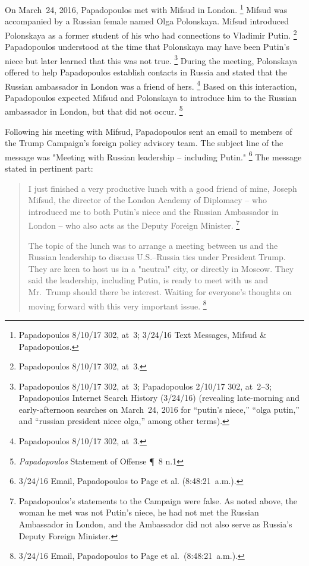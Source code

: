 On March~24, 2016, Papadopoulos met with Mifsud in London.%
\footnote{Papadopoulos 8/10/17 302, at~3; 3/24/16 Text Messages, Mifsud \& Papadopoulos.}
Mifsud was accompanied by a Russian female named Olga Polonskaya.
Mifsud introduced Polonskaya as a former student of his who had connections to Vladimir Putin.%
\footnote{Papadopoulos 8/10/17 302, at~3.}
Papadopoulos understood at the time that Polonskaya may have been Putin's niece but later learned that this was not true.%
\footnote{Papadopoulos 8/10/17 302, at~3;
Papadopoulos 2/10/17 302, at~2--3;
Papadopoulos Internet Search History (3/24/16) (revealing late-morning and early-afternoon searches on March~24, 2016 for ``putin's niece,'' ``olga putin,'' and ``russian president niece olga,'' among other terms).}
During the meeting, Polonskaya offered to help Papadopoulos establish contacts in Russia and stated that the Russian ambassador in London was a friend of hers.%
\footnote{Papadopoulos 8/10/17 302, at~3.}
Based on this interaction, Papadopoulos expected Mifsud and Polonskaya to introduce him to the Russian ambassador in London, but that did not occur.%
\footnote{\textit{Papadopoulos} Statement of Offense \P~8 n.1}

Following his meeting with Mifsud, Papadopoulos sent an email to members of the Trump Campaign's foreign policy advisory team. The subject line of the message was "Meeting with Russian leadership -- including Putin."%
\footnote{3/24/16 Email, Papadopoulos to Page et al. (8:48:21~a.m.).}
The message stated in pertinent part:

\begin{quote}
I just finished a very productive lunch with a good friend of mine, Joseph Mifsud, the director of the London Academy of Diplomacy -- who introduced me to both Putin's niece and the Russian Ambassador in London -- who also acts as the Deputy Foreign Minister.%
\footnote{Papadopoulos's statements to the Campaign were false.
As noted above, the woman he met was not Putin's niece, he had not met the Russian Ambassador in London, and the Ambassador did not also serve as Russia's Deputy Foreign Minister.}

The topic of the lunch was to arrange a meeting between us and the Russian leadership to discuss U.S.--Russia ties under President Trump.
They are keen to host us in a "neutral" city, or directly in Moscow.
They said the leadership, including Putin, is ready to meet with us and Mr.~Trump should there be interest.
Waiting for everyone's thoughts on moving forward with this very important issue.%
\footnote{3/24/16 Email, Papadopoulos to Page et al.\ (8:48:21~a.m.).}
\end{quote}

